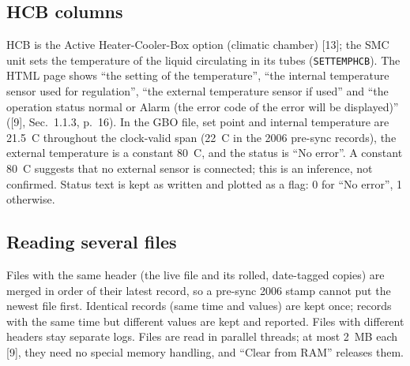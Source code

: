 \documentclass[11pt,a4paper]{article}
\newcommand{\tfournet}{[9]}
\renewcommand{\_}{\usscore\allowbreak}
\begin{document}
\subsection{HCB columns}
HCB is the Active Heater-Cooler-Box option (climatic chamber) [13]; the SMC unit sets the
temperature of the liquid circulating in its tubes (\texttt{SETTEMPHCB}). The HTML page shows ``the
setting of the temperature'', ``the internal temperature sensor used for regulation'', ``the
external temperature sensor if used'' and ``the operation status normal or Alarm (the error code
of the error will be displayed)'' (\tfournet, Sec.~1.1.3, p.~16). In the GBO file, set point and
internal temperature are 21.5~\textdegree C throughout the clock-valid span (22~\textdegree C in the
2006 pre-sync records), the external temperature is a constant 80~\textdegree C, and the status is
``No error''. A constant 80~\textdegree C suggests that no external sensor is connected; this is an
inference, not confirmed. Status text is kept as written and plotted as a flag: 0 for ``No error'',
1 otherwise.

\subsection{Reading several files}
Files with the same header (the live file and its rolled, date-tagged copies) are merged in order of
their latest record, so a pre-sync 2006 stamp cannot put the newest file first. Identical records
(same time and values) are kept once; records with the same time but different values are kept and
reported. Files with different headers stay separate logs. Files are read in parallel threads; at
most 2~MB each \tfournet, they need no special memory handling, and ``Clear from RAM'' releases them.
\end{document}
